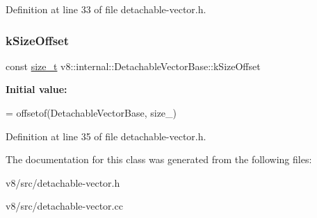 Definition at line 33 of file detachable-\/vector.\+h.

\mbox{\label{classv8_1_1internal_1_1DetachableVectorBase_a6ead13a66e56161c97567ba45a5461fb}} 
\subsubsection{\texorpdfstring{k\+Size\+Offset}{kSizeOffset}}
{\footnotesize\ttfamily const \mbox{\hyperlink{classsize__t}{size\+\_\+t}} v8\+::internal\+::\+Detachable\+Vector\+Base\+::k\+Size\+Offset\hspace{0.3cm}{\ttfamily [static]}}

{\bfseries Initial value\+:}
\begin{DoxyCode}
=
    offsetof(DetachableVectorBase, size\_)
\end{DoxyCode}


Definition at line 35 of file detachable-\/vector.\+h.



The documentation for this class was generated from the following files\+:\begin{DoxyCompactItemize}
\item 
v8/src/detachable-\/vector.\+h\item 
v8/src/detachable-\/vector.\+cc\end{DoxyCompactItemize}
